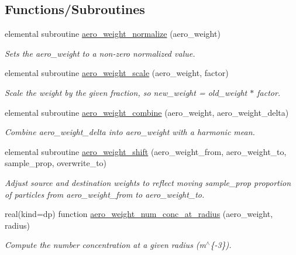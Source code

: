 \subsection*{Functions/\+Subroutines}
\begin{DoxyCompactItemize}
\item 
elemental subroutine \mbox{\hyperlink{namespacepmc__aero__weight_acd4fbc759a69ec55409de3aa8aa16698}{aero\+\_\+weight\+\_\+normalize}} (aero\+\_\+weight)
\begin{DoxyCompactList}\small\item\em Sets the {\ttfamily aero\+\_\+weight} to a non-\/zero normalized value. \end{DoxyCompactList}\item 
elemental subroutine \mbox{\hyperlink{namespacepmc__aero__weight_a579fef892d29e49b507db823d2e0379a}{aero\+\_\+weight\+\_\+scale}} (aero\+\_\+weight, factor)
\begin{DoxyCompactList}\small\item\em Scale the weight by the given fraction, so {\ttfamily new\+\_\+weight = old\+\_\+weight $\ast$ factor}. \end{DoxyCompactList}\item 
elemental subroutine \mbox{\hyperlink{namespacepmc__aero__weight_a59ef26ebd83b97722ed819972ba7b78d}{aero\+\_\+weight\+\_\+combine}} (aero\+\_\+weight, aero\+\_\+weight\+\_\+delta)
\begin{DoxyCompactList}\small\item\em Combine {\ttfamily aero\+\_\+weight\+\_\+delta} into {\ttfamily aero\+\_\+weight} with a harmonic mean. \end{DoxyCompactList}\item 
elemental subroutine \mbox{\hyperlink{namespacepmc__aero__weight_aaebf43b0695852cc82ee916fc4341dd3}{aero\+\_\+weight\+\_\+shift}} (aero\+\_\+weight\+\_\+from, aero\+\_\+weight\+\_\+to, sample\+\_\+prop, overwrite\+\_\+to)
\begin{DoxyCompactList}\small\item\em Adjust source and destination weights to reflect moving {\ttfamily sample\+\_\+prop} proportion of particles from {\ttfamily aero\+\_\+weight\+\_\+from} to {\ttfamily aero\+\_\+weight\+\_\+to}. \end{DoxyCompactList}\item 
real(kind=dp) function \mbox{\hyperlink{namespacepmc__aero__weight_aca13cabb919a67bd13c75333b7a8daa9}{aero\+\_\+weight\+\_\+num\+\_\+conc\+\_\+at\+\_\+radius}} (aero\+\_\+weight, radius)
\begin{DoxyCompactList}\small\item\em Compute the number concentration at a given radius (m$^\wedge$\{-\/3\}). \end{DoxyCompactList}\item 

\end{DoxyCompactItemize}

